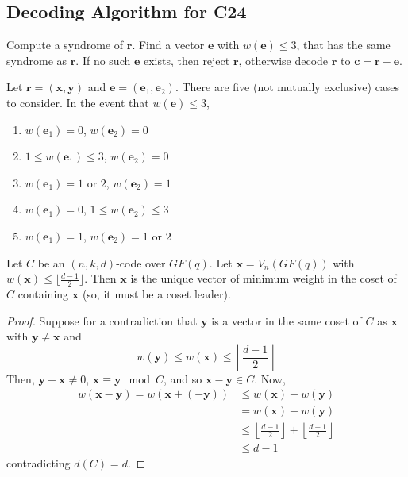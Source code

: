 \subsection{Decoding Algorithm for C24}
Compute a syndrome of $ \bm{r} $. Find a vector $ \bm{e} $ with $ w(\bm{e})\leqslant 3 $,
that has the same syndrome as $ \bm{r} $. If no such $ \bm{e} $ exists, then
reject $ \bm{r} $, otherwise decode $ \bm{r} $ to $ \bm{c}=\bm{r}-\bm{e} $.

Let $ \bm{r}=(\bm{x},\bm{y}) $ and $ \bm{e}=(\bm{e}_1,\bm{e}_2) $.
There are five (not mutually exclusive) cases to consider. In the event that
$ w(\bm{e})\leqslant 3 $,
\begin{enumerate}[label=(\Alph*)]
    \item $ w(\bm{e}_1)=0 $, $ w(\bm{e}_2)=0 $
    \item $ 1\leqslant w(\bm{e}_1)\leqslant 3 $, $ w(\bm{e}_2)=0 $
    \item $ w(\bm{e}_1)=1 $ or $ 2 $, $ w(\bm{e}_2)=1 $
    \item $ w(\bm{e}_1)=0 $, $ 1\leqslant w(\bm{e}_2)\leqslant 3 $
    \item $ w(\bm{e}_1)=1 $, $ w(\bm{e}_2)=1 $ or $ 2 $
\end{enumerate}

\begin{thmbox}
    \begin{theorem}
        Let $ C $ be an $ (n,k,d) $-code over $ GF(q) $. Let $ \bm{x}=
            V_n(GF(q)) $ with $ w(\bm{x})\leqslant \lfloor \frac{d-1}{2} \rfloor $.
        Then $ \bm{x} $ is the unique vector of minimum weight in the coset
        of $ C $ containing $ \bm{x} $ (so, it must be a coset leader).
    \end{theorem}
\end{thmbox}

\begin{proof}
    Suppose for a contradiction that
    $ \bm{y} $ is a vector in the same coset of $ C $ as $ \bm{x} $
    with $ \bm{y}\neq \bm{x} $ and
    \[ w(\bm{y})\leqslant w(\bm{x})\leqslant \left\lfloor \frac{d-1}{2} \right\rfloor \]
    Then, $ \bm{y}-\bm{x}\neq 0 $, $ \bm{x}\equiv \bm{y}\mod C $,
    and so $ \bm{x}-\bm{y}\in C $. Now,
    \begin{align*}
        w(\bm{x}-\bm{y})=w(\bm{x}+(-\bm{y}))
         & \leqslant w(\bm{x})+w(\bm{y})                                                                 \\
         & =w(\bm{x})+w(\bm{y})                                                                          \\
         & \leqslant \left\lfloor \frac{d-1}{2} \right\rfloor + \left\lfloor \frac{d-1}{2} \right\rfloor \\
         & \leqslant d-1
    \end{align*}
    contradicting $ d(C)=d $.
\end{proof}
